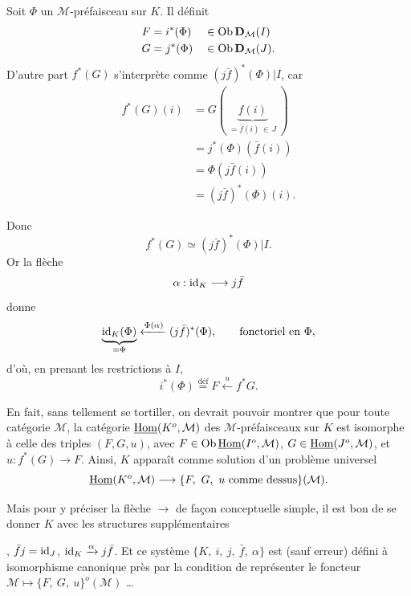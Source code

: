Soit $\Phi$ un $\mathcal{M}$-préfaisceau sur $K$. Il définit
\[
\begin{aligned}
F &= i^*(\Phi) && \in \mathrm{Ob}\, \mathbf{D}_{\mathcal{M}}(I)\\
G &= j^*(\Phi) && \in \mathrm{Ob}\, \mathbf{D}_{\mathcal{M}}(J).
\end{aligned}
\]
D'autre part $f^*(G)$ s'interprète comme $(j\bar{f})^*(\Phi)|I$, car
\[
\begin{aligned}
f^*(G)(i) &= G(\ \underbrace{f(i)}_{= \bar{f}(i) \,\in\, J}\ )\\
&= j^*(\Phi)(\bar{f}(i))\\
&= \Phi(j\bar{f}(i))\\
&= (j\bar{f})^*(\Phi)(i).
\end{aligned}
\]

Donc
\[ f^*(G) \simeq (j\bar{f})^*(\Phi)|I. \]
Or la flèche
\[ \alpha : \mathrm{id}_K \longrightarrow j\bar{f} \]
donne
\[ \underbrace{\mathrm{id}_K(\Phi)}_{= \Phi} \xleftarrow{\Phi(\alpha)} (j\bar{f})^*(\Phi), \qquad \text{fonctoriel en } \Phi, \]
d'où, en prenant les restrictions à $I$,
\[ i^*(\Phi) \overset{\text{déf}}{=} F \xleftarrow{\ u\ } f^*G. \]

En fait, sans tellement se tortiller, on devrait pouvoir montrer que pour toute catégorie $\mathcal{M}$, la catégorie $\underline{\mathrm{Hom}}(K^o, \mathcal{M})$ des $\mathcal{M}$-préfaisceaux sur $K$ est isomorphe à celle des triples $(F,G,u)$, avec $F \in \mathrm{Ob}\, \underline{\mathrm{Hom}}(I^o, \mathcal{M})$, $G \in \underline{\mathrm{Hom}}(J^o, \mathcal{M})$, et $u : f^*(G) \longrightarrow F$. Ainsi, $K$ apparaît comme solution d'un problème universel
\[ \uHom(K^o, \mathcal{M}) \longrightarrow \{F,\ G,\ u \text{ comme dessus}\}(\mathcal{M}). \]

Mais pour y préciser la flèche $\longrightarrow$ de façon conceptuelle simple, il est bon de se donner $K$ avec les structures supplémentaires , $\bar{f}j = \mathrm{id}_J$, $\mathrm{id}_K \xrightarrow{\alpha} j\bar{f}$. Et ce système %
$\{K,\ i,\ j,\ \bar{f},\ \alpha\}$ est (sauf erreur) défini à isomorphisme canonique près par la condition de représenter le foncteur $\mathcal{M} \longmapsto \{F,\ G,\ u\}^o(\mathcal{M})$ \dots

